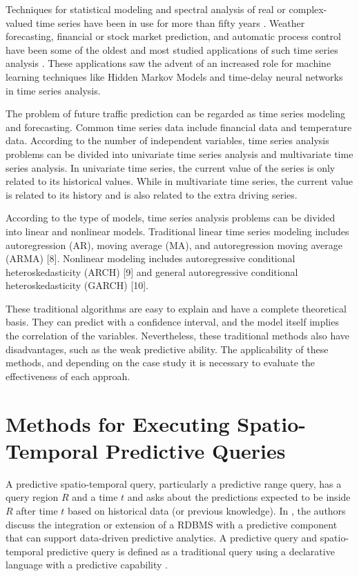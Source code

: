 Techniques for statistical modeling and spectral analysis of real or complex-valued time series have been in use for more than fifty years \cite{Hyndman2006, Chatfield2019}. Weather forecasting, financial or stock market prediction, and automatic process control have been some of the oldest and most studied applications of such time series analysis \cite{Box1976}. These applications saw the advent of an increased role for machine learning techniques like Hidden Markov Models and time-delay neural networks in time series analysis.

The problem of future traffic prediction can be regarded as time series modeling and forecasting. Common time series data include financial data and temperature data. According to the number of independent variables, time series analysis problems can be divided into univariate time series analysis and multivariate time series analysis. In univariate time series, the current value of the series is only related to its historical values. While in multivariate time series, the current value is related to its history and is also related to the extra driving series. 

According to the type of models, time series analysis problems can be divided into linear and nonlinear models. Traditional linear time series modeling includes autoregression (AR), moving average (MA), and autoregression moving average (ARMA) [8]. Nonlinear modeling includes autoregressive conditional heteroskedasticity (ARCH) [9] and general autoregressive conditional heteroskedasticity (GARCH) [10]. 

These traditional algorithms are easy to explain and have a complete theoretical basis. They can predict with a confidence interval, and the model itself implies the correlation of the variables. Nevertheless, these traditional methods also have disadvantages, such as the weak predictive ability. 
The applicability of these methods, and depending on the case study it is necessary to evaluate the effectiveness of each approah.

\section{Methods for Executing Spatio-Temporal Predictive Queries}
\label{Sec:RelatedWorksQueries}

A predictive spatio-temporal query, particularly a predictive range query, has a query region $R$ and a time $t$ and asks about the predictions expected to be inside $R$ after time $t$ based on historical data (or previous knowledge). In \cite{Akdere2011}, the authors discuss the integration or extension of a RDBMS with a predictive component that can support data-driven predictive analytics. A predictive query and spatio-temporal predictive query is defined as a traditional query using a declarative language with a predictive capability \cite{Hendawi2012}. 

